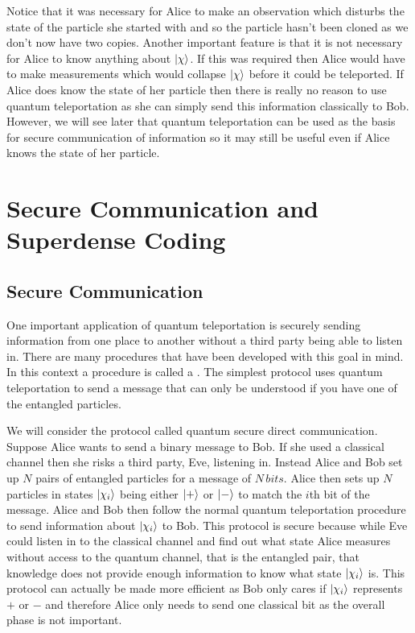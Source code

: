     Notice that it was necessary for Alice to make an observation which disturbs the state of the particle she started with and so the particle hasn't been cloned as we don't now have two copies.
    Another important feature is that it is not necessary for Alice to know anything about \(\vert {\chi} \rangle\).
    If this was required then Alice would have to make measurements which would collapse \(\vert {\chi} \rangle\) before it could be teleported.
    If Alice does know the state of her particle then there is really no reason to use quantum teleportation as she can simply send this information classically to Bob.
    However, we will see later that quantum teleportation can be used as the basis for secure communication of information so it may still be useful even if Alice knows the state of her particle.
    
    \section{Secure Communication and Superdense Coding}
    \subsection{Secure Communication}
    One important application of quantum teleportation is securely sending information from one place to another without a third party being able to listen in.
    There are many procedures that have been developed with this goal in mind.
    In this context a procedure is called a .
    The simplest protocol uses quantum teleportation to send a message that can only be understood if you have one of the entangled particles.
    
    We will consider the protocol called quantum secure direct communication.
    Suppose Alice wants to send a binary message to Bob.
    If she used a classical channel then she risks a third party, Eve, listening in.
    Instead Alice and Bob set up \(N\) pairs of entangled particles for a message of \(N\,\si{bits}\).
    Alice then sets up \(N\) particles in states \(\vert {\chi_i} \rangle\) being either \(\vert {+} \rangle\) or \(\vert {-} \rangle\) to match the \(i\)th bit of the message.
    Alice and Bob then follow the normal quantum teleportation procedure to send information about \(\vert {\chi_i} \rangle\) to Bob.
    This protocol is secure because while Eve could listen in to the classical channel and find out what state Alice measures without access to the quantum channel, that is the entangled pair, that knowledge does not provide enough information to know what state \(\vert {\chi_i} \rangle\) is.
    This protocol can actually be made more efficient as Bob only cares if \(\vert {\chi_i} \rangle\) represents \(+\) or \(-\) and therefore Alice only needs to send one classical bit as the overall phase is not important.
    
